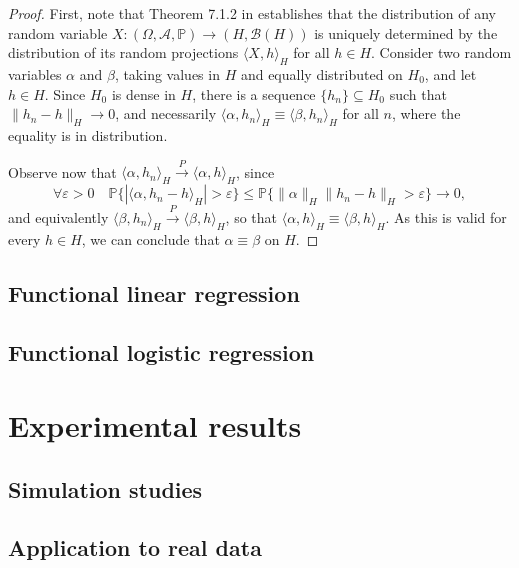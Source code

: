 \documentclass[ba]{imsart}
\numberwithin{equation}{section}
\theoremstyle{plain}
\renewcommand{\epsilon}{\varepsilon}
\begin{document}
\begin{proof}

First, note that Theorem 7.1.2 in \citet[p.~177]{hsing2015theoretical} establishes that the distribution of any random variable \(X: (\Omega, \mathcal A, \mathbb{P})\to (H, \mathcal B(H))\) is uniquely determined by the distribution of its random projections \(\langle X, h\rangle_H\) for all \(h \in H\).
Consider two random variables \(\alpha\) and \(\beta\), taking values in \(H\) and equally distributed on \(H_0\), and let \(h \in H\). Since \(H_0\) is dense in \(H\), there is a sequence \(\{h_n\}\subseteq H_0\) such that \(\|h_n - h\|_H \to 0\), and necessarily \(\langle \alpha, h_n\rangle_H \equiv \langle \beta, h_n\rangle_H\) for all \(n\), where the equality is in distribution.

Observe now that \(\langle \alpha, h_n\rangle_H \overset{P}{\to} \langle \alpha, h\rangle_H\), since
\[
\forall \epsilon > 0 \quad \mathbb{P}\{|\langle \alpha, h_n - h\rangle_H| > \epsilon\} \leq \mathbb{P}\{\|\alpha\|_H \|h_n - h\|_H > \epsilon\} \to 0,
\]
and equivalently \(\langle \beta, h_n \rangle_H \overset{P}{\to} \langle \beta, h\rangle_H\), so that \(\langle \alpha, h \rangle_H \equiv \langle \beta,h\rangle_H\). As this is valid for every \(h \in H\), we can conclude that \(\alpha \equiv \beta\) on \(H\).
\end{proof}


\subsection{Functional linear regression}

\subsection{Functional logistic regression}

\section{Experimental results}

\subsection{Simulation studies}

\subsection{Application to real data}
\end{document}

